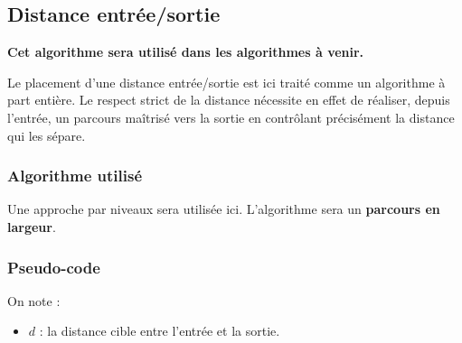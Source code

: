 \documentclass{butexFR}
\begin{document}
\subsection{Distance entrée/sortie}

\textbf{Cet algorithme sera utilisé dans les algorithmes à venir.}

Le placement d’une distance entrée/sortie est ici traité comme un algorithme à part entière. Le respect strict de la distance nécessite en effet de réaliser, depuis l’entrée, un parcours maîtrisé vers la sortie en contrôlant précisément la distance qui les sépare.

\subsubsection{Algorithme utilisé}

Une approche par niveaux sera utilisée ici. L'algorithme sera un \textbf{parcours en largeur}.

\newpage

\subsubsection{Pseudo-code}

On note :
\begin{itemize}
\item \( d \) : la distance cible entre l'entrée et la sortie.
\end{itemize}
\end{document}
